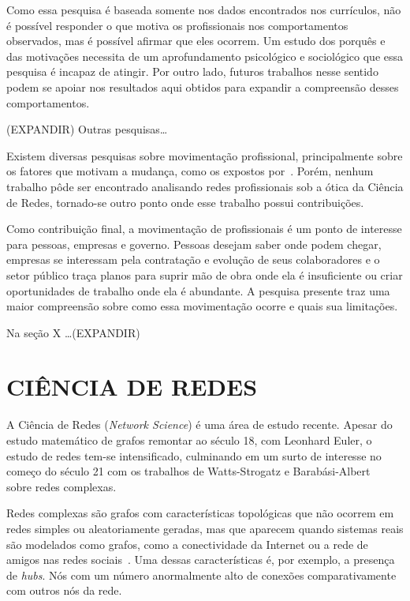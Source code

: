 \documentclass[12pt,a4paper]{article}
\begin{document}
Como essa pesquisa é baseada somente nos dados encontrados nos currículos, não é possível responder o que motiva os profissionais nos comportamentos observados, mas é possível afirmar que eles ocorrem. Um estudo dos porquês e das motivações necessita de um aprofundamento psicológico e sociológico que essa pesquisa é incapaz de atingir. Por outro lado, futuros trabalhos nesse sentido podem se apoiar nos resultados aqui obtidos para expandir a compreensão desses comportamentos.

(EXPANDIR) Outras pesquisas\ldots

Existem diversas pesquisas sobre movimentação profissional, principalmente sobre os fatores que motivam a mudança, como os expostos por~. Porém, nenhum trabalho pôde ser encontrado analisando redes profissionais sob a ótica da Ciência de Redes, tornado-se outro ponto onde esse trabalho possui contribuições.

Como contribuição final, a movimentação de profissionais é um ponto de interesse para pessoas, empresas e governo. Pessoas desejam saber onde podem chegar, empresas se interessam pela contratação e evolução de seus colaboradores e o setor público traça planos para suprir mão de obra onde ela é insuficiente ou criar oportunidades de trabalho onde ela é abundante. A pesquisa presente traz uma maior compreensão sobre como essa movimentação ocorre e quais sua limitações.

Na seção X \ldots (EXPANDIR)

\section{CIÊNCIA DE REDES}

A Ciência de Redes (\textit{Network Science}) é uma área de estudo recente. Apesar do estudo matemático de grafos remontar ao século 18, com Leonhard Euler, o estudo de redes tem-se intensificado, culminando em um surto de interesse no começo do século 21 com os trabalhos de Watts-Strogatz e Barabási-Albert~\cite{Watts1998-wt,Barabasi1999-sn} sobre redes complexas.

Redes complexas são grafos com características topológicas que não ocorrem em redes simples ou aleatoriamente geradas, mas que aparecem quando sistemas reais são modelados como grafos, como a conectividade da Internet ou a rede de amigos nas redes sociais~\cite{Barabasi2016-rn}. Uma dessas características é, por exemplo, a presença de \textit{hubs}. Nós com um número anormalmente alto de conexões comparativamente com outros nós da rede.
\end{document}
